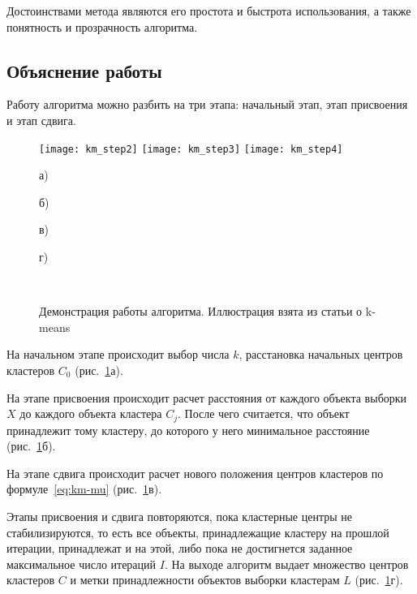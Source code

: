 Достоинствами метода являются его простота и быстрота использования, а также понятность и прозрачность алгоритма.

\subsection{Объяснение работы}
Работу алгоритма можно разбить на три этапа: начальный этап, этап присвоения и этап сдвига.

\begin{figure}[h!]
    \centering
     \hspace{1ex}
    \texttt{[image: km\_step2]} \hspace{1ex}
    \texttt{[image: km\_step3]} \hspace{1ex}
    \texttt{[image: km\_step4]} \\
    \parbox{.2\textwidth}{\centering\small а)} \hspace{1ex}
    \parbox{.2\textwidth}{\centering\small б)} \hspace{1ex}
    \parbox{.2\textwidth}{\centering\small в)} \hspace{1ex}
    \parbox{.2\textwidth}{\centering\small г)} \\[1ex]
    \parbox{.9\textwidth}{\caption{Демонстрация работы алгоритма. Иллюстрация взята из статьи о k-means~\cite{wiki}}\label{pic:km_steps}}
\end{figure}

На начальном этапе происходит выбор числа \( k \), расстановка начальных центров кластеров \( C_0 \) (рис.~\ref{pic:km_steps}а).

На этапе присвоения происходит расчет расстояния от каждого объекта выборки \( X \) до каждого объекта кластера \( C_j \). После чего считается, что объект принадлежит тому кластеру, до которого у него минимальное расстояние (рис.~\ref{pic:km_steps}б).

На этапе сдвига происходит расчет нового положения центров кластеров по формуле~\eqref{eq:km-mu} (рис.~\ref{pic:km_steps}в).

Этапы присвоения и сдвига повторяются, пока кластерные центры не стабилизируются, то есть все объекты, принадлежащие кластеру на прошлой итерации, принадлежат и на этой, либо пока не достигнется заданное максимальное число итераций \( I \). На выходе алгоритм выдает множество центров кластеров \( C \) и метки принадлежности объектов выборки кластерам \( L \) (рис.~\ref{pic:km_steps}г).

